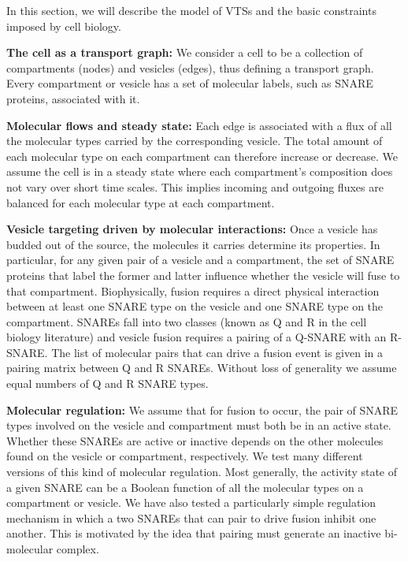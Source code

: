 
In this section, we will describe the model of VTSs and the basic constraints imposed by cell biology.

\textbf{The cell as a transport graph:} We consider a cell to be a collection of compartments (nodes) and vesicles (edges), thus defining a transport graph. Every compartment or vesicle has a set of molecular labels, such as SNARE proteins, associated with it.

\textbf{Molecular flows and steady state:} Each edge is associated with a flux of all the molecular types carried by the corresponding vesicle. The total amount of each molecular type on each compartment can therefore increase or decrease. We assume the cell is in a steady state where each compartment’s composition does not vary over short time scales. This implies incoming and outgoing fluxes are balanced for each molecular type at each compartment.

\textbf{Vesicle targeting driven by molecular interactions:} Once a vesicle has budded out of the source, the molecules it carries determine its properties. In particular, for any given pair of a vesicle and a compartment, the set of SNARE proteins that label the former and latter influence whether the vesicle will fuse to that compartment. Biophysically, fusion requires a direct physical interaction between at least one SNARE type on the vesicle and one SNARE type on the compartment. SNAREs fall into two classes (known as Q and R in the cell biology literature) and vesicle fusion requires a pairing of a Q-SNARE with an R-SNARE. The list of molecular pairs that can drive a fusion event is given in a pairing matrix between Q and R SNAREs. Without loss of generality we assume equal numbers of Q and R SNARE types.

\textbf{Molecular regulation:} We assume that for fusion to occur, the pair of SNARE types involved on the vesicle and compartment must both be in an active state. Whether these SNAREs are active or inactive depends on the other molecules found on the vesicle or compartment, respectively. We test many different versions of this kind of molecular regulation. Most generally, the activity state of a given SNARE can be a Boolean function of all the molecular types on a compartment or vesicle. We have also tested \cite{shukla} a particularly simple regulation mechanism in which a two SNAREs that can pair to drive fusion inhibit one another. This is motivated by the idea that pairing must generate an inactive bi-molecular complex.

